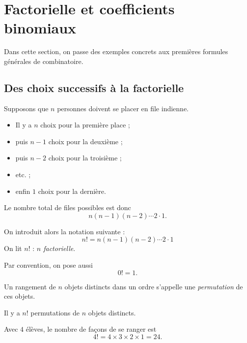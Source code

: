 \documentclass[11pt]{article}
\begin{document}
\section{Factorielle et coefficients binomiaux}\label{sec:factorielle-binomiaux}

Dans cette section, on passe des exemples concrets aux premières formules générales
de combinatoire.

\subsection{Des choix successifs à la factorielle}\label{sec:factorielle}

Supposons que \(n\) personnes doivent se placer en file indienne.

\begin{itemize}
    \item Il y a \(n\) choix pour la première place ;
    \item puis \(n-1\) choix pour la deuxième ;
    \item puis \(n-2\) choix pour la troisième ;
    \item etc. ;
    \item enfin \(1\) choix pour la dernière.
\end{itemize}

Le nombre total de files possibles est donc
\[
n(n-1)(n-2)\cdots 2\cdot 1.
\]

\begin{definition}[Factorielle]\label{def:factorielle}
On introduit alors la notation suivante :
\[
\boxed{n! = n(n-1)(n-2)\cdots 2\cdot 1}
\]
On lit \(n!\) : \emph{\(n\) factorielle}.

Par convention, on pose aussi
\[
\boxed{0! = 1.}
\]
\end{definition}

\begin{definition}[Permutation]\label{def:permutation}
Un rangement de \(n\) objets distincts dans un ordre s’appelle une \emph{permutation}
de ces objets.
\end{definition}

\begin{proposition}\label{prop:permutations}
Il y a \(n!\) permutations de \(n\) objets distincts.
\end{proposition}

\begin{exemple}
Avec \(4\) élèves, le nombre de façons de se ranger est
\[
4! = 4\times 3\times 2\times 1 = 24.
\]
\end{exemple}
\end{document}
